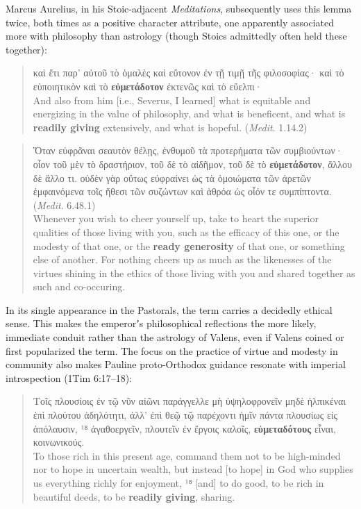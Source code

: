 Marcus Aurelius, in his Stoic-adjacent \textit{Meditations}, %
subsequently uses this lemma twice, both times as a positive character attribute, %
one apparently associated more with philosophy than astrology (though Stoics admittedly often held these together): %

\vspace*{2mm} 
 \begin{quote}καὶ ἔτι παρ’ αὐτοῦ τὸ ὁμαλὲς καὶ εὔτονον ἐν τῇ τιμῇ τῆς φιλοσοφίας· %
 καὶ τὸ εὐποιητικὸν καὶ τὸ \textbf{εὐμετάδοτον} ἐκτενῶς καὶ τὸ εὔελπι· \\[1mm] %
 And also from him [i.e., Severus, I learned] what is equitable %
 and energizing in the value of philosophy, %
 and what is beneficent, and what is \textbf{readily giving} extensively, and what is hopeful. (\textit{Medit}. 1.14.2) %
 \end{quote} %
\vspace*{1mm}
 
 \begin{quote}Ὅταν εὐφρᾶναι σεαυτὸν θέλῃς, ἐνθυμοῦ τὰ προτερήματα τῶν
 συμβιούντων· οἷον τοῦ μὲν τὸ δραστήριον, τοῦ δὲ τὸ αἰδῆμον,
 τοῦ δὲ τὸ \textbf{εὐμετάδοτον}, ἄλλου δὲ ἄλλο τι. οὐδὲν γὰρ οὕτως
 εὐφραίνει ὡς τὰ ὁμοιώματα τῶν ἀρετῶν ἐμφαινόμενα τοῖς ἤθεσι
 τῶν συζώντων καὶ ἀθρόα ὡς οἷόν τε συμπίπτοντα. (\textit{Medit}. 6.48.1) \\[1mm] %
 Whenever you wish to cheer yourself up, %
 take to heart the superior qualities of those living with you, %
 such as the efficacy of this one, or the modesty of that one, %
 or the \textbf{ready generosity} of that one, or something else of another. %
 For nothing cheers up as much as the likenesses of the virtues %
 shining in the ethics of those living with you and %
 shared together as such and co-occuring. 
  \end{quote} %
 \vspace*{2mm}

 In its single appearance in the Pastorals, the term carries a decidedly ethical sense. %
 This makes the emperorʼs philosophical reflections the more likely, immediate conduit %
 rather than the astrology of Valens, even if Valens coined or first popularized the term. %
 The focus on the practice of virtue and modesty in community also makes %
 Pauline proto-Orthodox guidance resonate with imperial introspection (1Tim 6:17--18): %

\vspace*{2mm} 
 \begin{quote}Τοῖς πλουσίοις ἐν τῷ νῦν αἰῶνι παράγγελλε μὴ %
 ὑψηλοφρονεῖν μηδὲ ἠλπικέναι ἐπὶ πλούτου ἀδηλότητι, %
 ἀλλ’ ἐπὶ θεῷ τῷ παρέχοντι ἡμῖν πάντα πλουσίως εἰς ἀπόλαυσιν, %
 ¹⁸ ἀγαθοεργεῖν, πλουτεῖν ἐν ἔργοις καλοῖς, \textbf{εὐμεταδότους} εἶναι, κοινωνικούς. \\[1mm] %
 To those rich in this present age, command them not to %
 be high-minded nor to hope in uncertain wealth, %
 but instead [to hope] in God who supplies us everything richly for enjoyment, %
 ¹⁸ [and] to do good, to be rich in beautiful deeds, %
 to be \textbf{readily giving}, sharing. %
 \end{quote} %
 \vspace*{2mm} 

